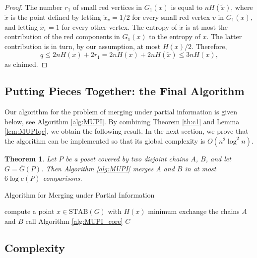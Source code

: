 \documentclass{article} \usepackage{fullpage}
\newtheorem{theorem}{Theorem}
\newcommand{\STAB}{\mathrm{STAB}}
\newcommand{\ent}{H}
\begin{document}
\begin{proof}
The number $r_{1}$ of small red vertices in $G_{1}(x)$ 
is equal to $n \ent(\tilde{x})$, where $\tilde x$ is the point defined
by letting $\tilde{x}_{v}= 1/2$ for every small red vertex $v$ in $G_{1}(x)$, and letting
$\tilde{x}_{v}= 1$ for every other vertex. 
The entropy of $\tilde{x}$ is at most the contribution 
of the red components in $G_{1}(x)$ to the entropy of $x$. The latter contribution
is in turn, by our assumption, at most $\ent(x)/2$. Therefore, 
$$
q \leq 2n \ent(x) + 2 r_{1} = 2n \ent(x) + 2n \ent(\tilde{x}) \leq 3n \ent(x),
$$
as claimed.
\end{proof}

\subsection{Putting Pieces Together: the Final Algorithm}
\label{sec:MUPI}

Our algorithm for the problem of merging under partial information is given below, see Algorithm \ref{alg:MUPI}. By combining Theorem \ref{th:c1} and Lemma \ref{lem:MUPIqc}, we obtain the following result. In the next section, we prove that the algorithm can be implemented so that its global complexity is $O(n^2 \log^2 n)$.

\begin{theorem}
Let $P$ be a poset covered by two disjoint chains $A$, $B$, and let $G = \bar{G}(P)$. Then Algorithm \ref{alg:MUPI} merges $A$ and $B$ in at most $6 \log e(P)$ comparisons.
\end{theorem}

\begin{algorithm}[h!]
\caption{Algorithm for Merging under Partial Information} \label{alg:MUPI}
\begin{algorithmic}[1]
\STATE \label{line:H(P)_width_2} compute a point $x \in \STAB(G)$ with $H(x)$ minimum
\STATE exchange the chains $A$ and $B$
\ENDIF
{} 
\ENDIF
\ENDFOR
\STATE call Algorithm \ref{alg:MUPI_core}
\RETURN $C$
\end{algorithmic}
\end{algorithm}

\subsection{Complexity}
\label{sec:MUPI_complexity}
\end{document}
